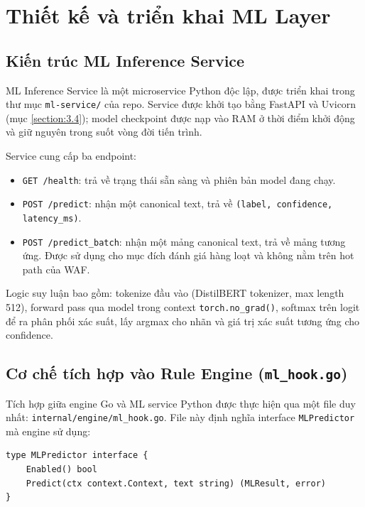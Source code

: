 \documentclass[../DoAn.tex]{subfiles}
\begin{document}
\section{Thiết kế và triển khai ML Layer}
\label{section:4.3}

\subsection{Kiến trúc ML Inference Service}
\label{subsection:4.3.1}

ML Inference Service là một microservice Python độc lập, được triển khai
trong thư mục \texttt{ml-service/} của repo. Service được khởi tạo bằng
FastAPI và Uvicorn (mục \ref{section:3.4}); model checkpoint được nạp vào
RAM ở thời điểm khởi động và giữ nguyên trong suốt vòng đời tiến trình.

Service cung cấp ba endpoint:
\begin{itemize}[leftmargin=*]
    \item \texttt{GET /health}: trả về trạng thái sẵn sàng và phiên bản
    model đang chạy.
    \item \texttt{POST /predict}: nhận một canonical text, trả về
    \texttt{(label, confidence, latency\_ms)}.
    \item \texttt{POST /predict\_batch}: nhận một mảng canonical text, trả
    về mảng tương ứng. Được sử dụng cho mục đích đánh giá hàng loạt và
    không nằm trên hot path của WAF.
\end{itemize}

Logic suy luận bao gồm: tokenize đầu vào (DistilBERT tokenizer, max length
512), forward pass qua model trong context \texttt{torch.no\_grad()},
softmax trên logit để ra phân phối xác suất, lấy argmax cho nhãn và giá trị
xác suất tương ứng cho confidence.

\subsection{Cơ chế tích hợp vào Rule Engine (\texttt{ml\_hook.go})}
\label{subsection:4.3.2}

Tích hợp giữa engine Go và ML service Python được thực hiện qua một file
duy nhất: \texttt{internal/engine/ml\_hook.go}. File này định nghĩa
interface \texttt{MLPredictor} mà engine sử dụng:

\begin{verbatim}
type MLPredictor interface {
    Enabled() bool
    Predict(ctx context.Context, text string) (MLResult, error)
}
\end{verbatim}
\end{document}

